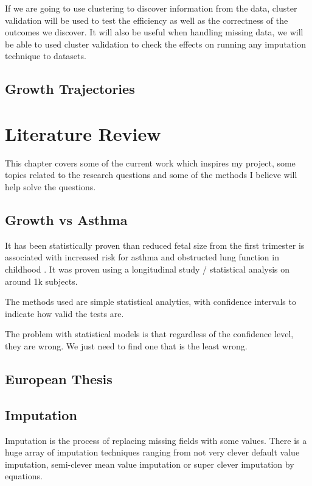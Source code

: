 \documentclass[bsc]{abdnthesis}
\begin{document}
If we are going to use clustering to discover information from the data, cluster validation will be used to test the efficiency as well as the correctness of the outcomes we discover. It will also be useful when handling missing data, we will be able to used cluster validation to check the effects on running any imputation technique to datasets.  
\section{Growth Trajectories} %
\label{sec:growth_trajectories}



\chapter{Literature Review}
This chapter covers some of the current work which inspires my project, some topics related to the research questions and some of the methods I believe will help solve the questions.
\section{Growth vs Asthma} %
\label{sec:growth_vs_asthma}
It has been statistically proven than reduced fetal size from the first trimester is associated with increased risk for asthma and obstructed lung function in childhood \cite{ turner1}. It was proven using a longitudinal study / statistical analysis on around 1k subjects. 

The methods used are simple statistical analytics, with confidence intervals to indicate how valid the tests are. 

The problem with statistical models is that regardless of the confidence level, they are wrong. We just need to find one that is the least wrong. 
\section{European Thesis} %
\label{sec:european_thesis}

\section{Imputation} %
\label{sec:imputation}
Imputation is the process of replacing missing fields with some values. There is a huge array of imputation techniques ranging from not very clever default value imputation, semi-clever mean value imputation or super clever imputation by equations. 
\end{document}
